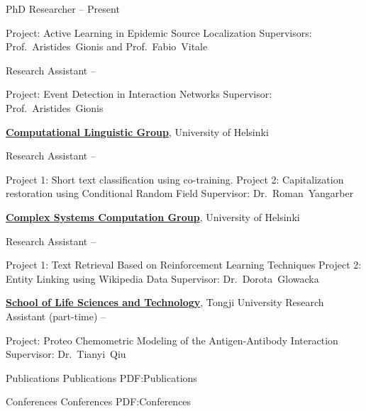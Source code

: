 \documentclass[letterpaper,MMMyyyy,nonstopmode]{simpleresumecv}
\begin{document}
\begin{Body}
\Gap
\BulletItem
PhD Researcher
\hfill
{} --
Present
\begin{Detail}
\SubBulletItem
Project:
Active Learning in Epidemic Source Localization
\SubBulletItem
Supervisors:
Prof.~Aristides~Gionis and
Prof.~Fabio~Vitale
\end{Detail}

\Gap
\BulletItem
Research Assistant
\hfill
{} --
\begin{Detail}
\SubBulletItem
Project:
Event Detection in Interaction Networks
\SubBulletItem
Supervisor:
Prof.~Aristides~Gionis
\end{Detail}


\Entry
\href{}
{\textbf{Computational Linguistic Group}},
University of Helsinki

\Gap
\BulletItem
Research Assistant
\hfill
{} --
\begin{Detail}
\SubBulletItem
Project 1: Short text classification using co-training.
\SubBulletItem
Project 2: Capitalization restoration using Conditional Random Field
\SubBulletItem
Supervisor:
Dr.~Roman~Yangarber
\end{Detail}

\Entry
\href{}
{\textbf{Complex Systems Computation Group}},
University of Helsinki

\Gap
\BulletItem
Research Assistant
\hfill
{} --
\begin{Detail}
\SubBulletItem
Project 1: Text Retrieval Based on Reinforcement Learning Techniques
\SubBulletItem
Project 2: Entity Linking using Wikipedia Data
\SubBulletItem
Supervisor:
Dr.~Dorota~Glowacka
\end{Detail}

\Entry
\href{}
{\textbf{School of Life Sciences and Technology}},
Tongji University
\Gap
\BulletItem
Research Assistant (part-time)
\hfill
{} --
\begin{Detail}
\SubBulletItem
Project: Proteo Chemometric Modeling of the Antigen-Antibody Interaction
\SubBulletItem
Supervisor:
Dr.~Tianyi~Qiu
\end{Detail}


\Section
{Publications}
{Publications}
{PDF:Publications}

\BigGap
\SubSection
{Conferences}
{Conferences}
{PDF:Conferences}


\end{Body}
\end{document}
